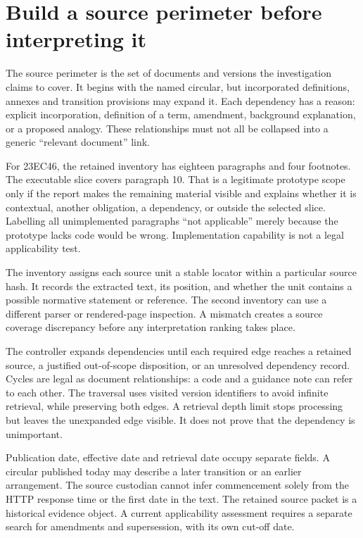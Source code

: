 \documentclass[12pt,a4paper,oneside,openany]{book}
\begin{document}
\section{Build a source perimeter before interpreting it}
\label{merge:M06:03}


The source perimeter is the set of documents and versions the investigation
claims to cover. It begins with the named circular, but incorporated definitions,
annexes and transition provisions may expand it. Each dependency has a reason:
explicit incorporation, definition of a term, amendment, background explanation,
or a proposed analogy. These relationships must not all be collapsed into a
generic ``relevant document'' link.

For 23EC46, the retained inventory has eighteen paragraphs and four footnotes.
The executable slice covers paragraph 10. That is a legitimate prototype scope
only if the report makes the remaining material visible and explains whether it
is contextual, another obligation, a dependency, or outside the selected slice.
Labelling all unimplemented paragraphs ``not applicable'' merely because the
prototype lacks code would be wrong. Implementation capability is not a legal
applicability test.

The inventory assigns each source unit a stable locator within a particular
source hash. It records the extracted text, its position, and whether the unit
contains a possible normative statement or reference. The second inventory can
use a different parser or rendered-page inspection. A mismatch creates a source
coverage discrepancy before any interpretation ranking takes place.

The controller expands dependencies until each required edge reaches a retained
source, a justified out-of-scope disposition, or an unresolved dependency record.
Cycles are legal as document relationships: a code and a guidance note can refer
to each other. The traversal uses visited version identifiers to avoid infinite
retrieval, while preserving both edges. A retrieval depth limit stops processing
but leaves the unexpanded edge visible. It does not prove that the dependency is
unimportant.

Publication date, effective date and retrieval date occupy separate fields. A
circular published today may describe a later transition or an earlier
arrangement. The source custodian cannot infer commencement solely from the HTTP
response time or the first date in the text. The retained source packet is a
historical evidence object. A current applicability assessment requires a
separate search for amendments and supersession, with its own cut-off date.
\end{document}
